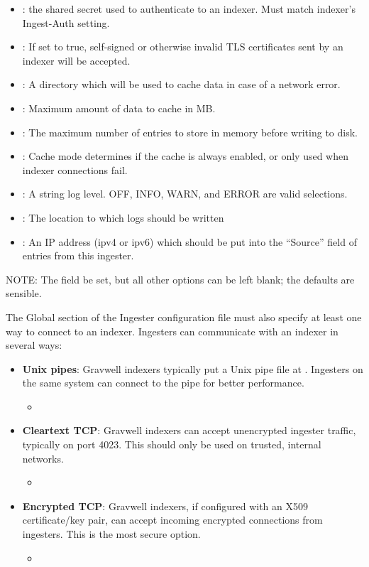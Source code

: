 \begin{itemize}
\item
  : the shared secret used to authenticate to an
  indexer. Must match indexer's Ingest-Auth setting.
\item
  : If set to true, self-signed or otherwise
  invalid TLS certificates sent by an indexer will be accepted.
\item
  : A directory which will be used to cache data in case
  of a network error.
\item
  : Maximum amount of data to cache in MB.
\item
  : The maximum number of entries to store in memory before writing to disk. 
\item
  : Cache mode determines if the cache is always enabled, or only used when indexer connections fail.
\item
  : A string log level. OFF, INFO, WARN, and ERROR are
  valid selections.
\item
  : The location to which logs should be written
\item
  : An IP address (ipv4 or ipv6) which should be put
  into the ``Source'' field of entries from this ingester.
\end{itemize}

NOTE: The  field  be set, but all other options
can be left blank; the defaults are sensible.

The Global section of the Ingester configuration file must also specify
at least one way to connect to an indexer. Ingesters can communicate
with an indexer in several ways:

\begin{itemize}
\item
  \textbf{Unix pipes}: Gravwell indexers typically put a Unix pipe file at
  . Ingesters on the same system can connect
  to the pipe for better performance.
	\begin{itemize}
	\item {}
	\end{itemize}
\item
  \textbf{Cleartext TCP}: Gravwell indexers can accept unencrypted ingester traffic, typically
  on port 4023. This should only be used on trusted, internal networks.
	\begin{itemize}
	\item {}
	\end{itemize}
\item
  \textbf{Encrypted TCP}: Gravwell indexers, if configured with an X509 certificate/key pair,
  can accept incoming encrypted connections from ingesters. This is the
  most secure option.
	\begin{itemize}
	\item {}
	\end{itemize}
\end{itemize}

